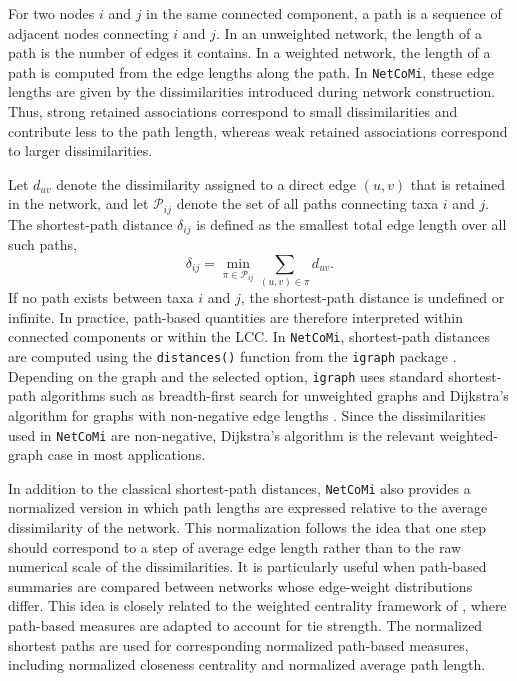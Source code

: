 For two nodes $i$ and $j$ in the same connected component, a path is a sequence of adjacent nodes connecting $i$ and $j$. In an unweighted network, the length of a path is the number of edges it contains. In a weighted network, the length of a path is computed from the edge lengths along the path. In \texttt{NetCoMi}, these edge lengths are given by the dissimilarities introduced during network construction. Thus, strong retained associations correspond to small dissimilarities and contribute less to the path length, whereas weak retained associations correspond to larger dissimilarities.

Let $d_{uv}$ denote the dissimilarity assigned to a direct edge $(u,v)$ that is retained in the network, and let $\mathcal{P}_{ij}$ denote the set of all paths connecting taxa $i$ and $j$. The shortest-path distance $\delta_{ij}$ is defined as the smallest total edge length over all such paths,
\begin{equation}
\label{eq:5net:net_analysis:shortest_path}
\delta_{ij} = \min_{\pi \in \mathcal{P}_{ij}} \sum_{(u,v)\in \pi} d_{uv}.
\end{equation}
If no path exists between taxa $i$ and $j$, the shortest-path distance is undefined or infinite. In practice, path-based quantities are therefore interpreted within connected components or within the LCC. In \texttt{NetCoMi}, shortest-path distances are computed using the \texttt{distances()} function from the \texttt{igraph} package \citep{csardi2006igraph}. Depending on the graph and the selected option, \texttt{igraph} uses standard shortest-path algorithms such as breadth-first search for unweighted graphs and Dijkstra's algorithm for graphs with non-negative edge lengths \citep{dijkstra1959note}. Since the dissimilarities used in \texttt{NetCoMi} are non-negative, Dijkstra's algorithm is the relevant weighted-graph case in most applications.

In addition to the classical shortest-path distances, \texttt{NetCoMi} also provides a normalized version in which path lengths are expressed relative to the average dissimilarity of the network. This normalization follows the idea that one step should correspond to a step of average edge length rather than to the raw numerical scale of the dissimilarities. It is particularly useful when path-based summaries are compared between networks whose edge-weight distributions differ. This idea is closely related to the weighted centrality framework of \citet{opsahl2010node}, where path-based measures are adapted to account for tie strength. The normalized shortest paths are used for corresponding normalized path-based measures, including normalized closeness centrality and normalized average path length.


